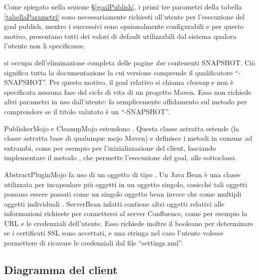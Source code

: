 Come spiegato nella sezione \S\ref{goalPublish}, i primi tre parametri della tabella \ref{tabellaParametri} sono necessariamente richiesti all'utente per l'esecuzione del goal publish, mentre i successivi sono opzionalmente configurabili e per questo motivo, presentano tutti dei valori di default utilizzabili dal sistema qualora l'utente non li specificasse.

 si occupa dell'eliminazione completa delle pagine \emph{doc} contenenti SNAPSHOT.
Ciò significa tutta la documentazione la cui versione comprende il qualificatore ``-SNAPSHOT''.
Per questo motivo, il goal relativo si chiama \emph{cleanup} e non è specificata nessuna fase del ciclo di vita di un progetto Maven.
Esso non richiede altri parametri in uso dall'utente: fa semplicemente affidamento sul metodo  per comprendere se il titolo valutato è un ``-SNAPSHOT''.

PublisherMojo e CleanupMojo estendono .
Questa classe astratta estende  (la classe astratta base di qualunque mojo Maven) e definisce i metodi in comune ad entrambi, come per esempio  per l'inizializzazione del client, lasciando implementare il metodo , che permette l'esecuzione del goal, alle sottoclassi.

AbstractPluginMojo fa uso di un oggetto di tipo .
Un Java Bean è una classe utilizzata per incapsulare più oggetti in un oggetto singolo, cosicché tali oggetti possano essere passati come un singolo oggetto bean invece che come multipli oggetti individuali \cite{site:java-bean}.
ServerBean infatti contiene altri oggetti relativi alle informazioni richieste per connettersi al server Confluence, come per esempio la URL e le credenziali dell'utente.
Esso richiede inoltre il booleano  per determinare se i certificati SSL sono accettati, e una stringa  nel caso l'utente volesse permettere di ricavare le credenziali dal file ``settings.xml''.

\subsection{Diagramma del client}

